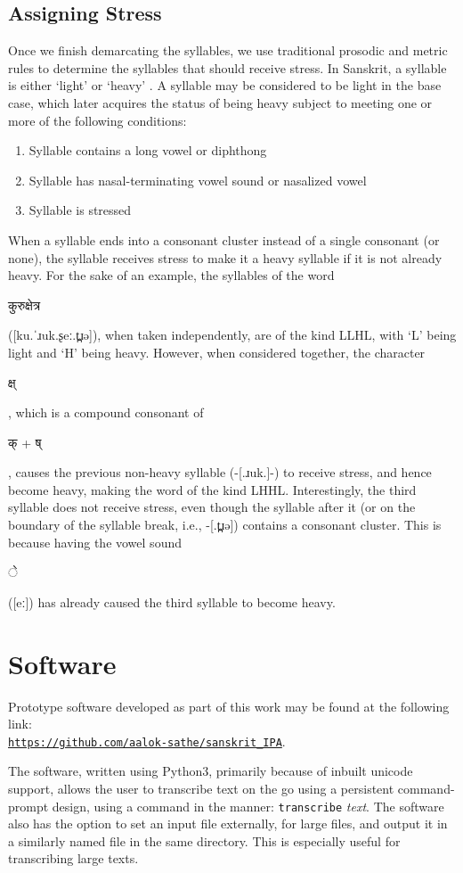 \documentclass[10pt,a4paper]{article}
\newcommand{\sansk}[1]{\begin{sanskrit}#1\end{sanskrit}}
\begin{document}
\subsection{Assigning Stress}
Once we finish demarcating the syllables, we use traditional prosodic and metric rules to determine the syllables that should receive stress. In Sanskrit, a syllable is either `light' or `heavy' \cite{sridharan2005sanskrit}. A syllable may be considered to be light in the base case, which later acquires the status of being heavy subject to meeting one or more of the following conditions:
\begin{enumerate}
	\item Syllable contains a long vowel or diphthong
	\item Syllable has nasal-terminating vowel sound or nasalized vowel
	\item Syllable is stressed
\end{enumerate}

When a syllable ends into a consonant cluster instead of a single consonant (or none), the syllable receives stress to make it a heavy syllable if it is not already heavy.
For the sake of an example, the syllables of the word \sansk{कुरु{क्षे}त्र} ([ku.ˈɹuk.ʂeː.t̪ɹə]), when taken independently, are of the kind LLHL, with `L' being light and `H' being heavy. However, when considered together, the character \sansk{क्ष्}, which is a compound consonant of \sansk{क् + ष्}, causes the previous non-heavy syllable (-[.ɹuk.]-) to receive stress, and hence become heavy, making the word of the kind LHHL. Interestingly, the third syllable does not receive stress, even though the syllable after it (or on the boundary of the syllable break, i.e., -[.t̪ɹə]) contains a consonant cluster. This is because having the vowel sound \sansk{े} ([eː]) has already caused the third syllable to become heavy.

\vspace{.3\baselineskip}

\section{Software}
Prototype software developed as part of this work may be found at the following link:\\
\hyperref{https://github.com/aalok-sathe/sanskrit_IPA}{}{}{\tt https://github.com/aalok-sathe/sanskrit\_IPA}.


The software, written using Python3, primarily because of inbuilt unicode support, allows the user to transcribe text on the go using a persistent command-prompt design, using a command in the manner: \texttt{transcribe} \textit{text}. The software also has the option to set an input file externally, for large files, and output it in a similarly named file in the same directory. This is especially useful for transcribing large texts.
\end{document}
